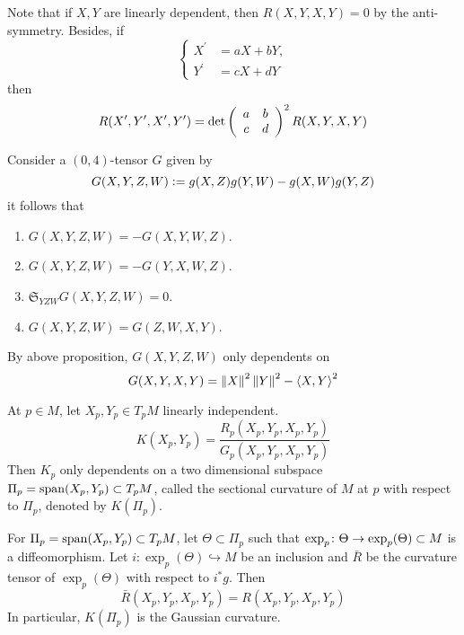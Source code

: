 \begin{enumerate}[label=\arabic{*}.]
\begin{rmk}
		Note that if $X,Y$ are linearly dependent, then $R(X,Y,X,Y) = 0$ by the anti-symmetry. Besides, if
		\begin{equation*}
			\left\{
				\begin{aligned}
					X^\prime & = aX+bY,\\
					Y^\prime & = cX+dY
				\end{aligned}
			\right.
		\end{equation*}
		then
		\begin{equation*}
			R(X^\prime,Y^\prime,X^\prime,Y^\prime) = \det\left(
				\begin{array}{cc}
					a&b\\
					c&d
				\end{array}
			\right)^2R(X,Y,X,Y)
		\end{equation*}
	\end{rmk}
	Consider a $(0,4)$-tensor $G$ given by
	\begin{equation*}
		G(X,Y,Z,W) \vcentcolon= g(X,Z)g(Y,W) - g(X,W)g(Y,Z)
	\end{equation*}
	it follows that
	\begin{enumerate}[label=(\arabic{*})]
		\item $G(X,Y,Z,W) = -G(X,Y,W,Z)$.
		\item $G(X,Y,Z,W) = -G(Y,X,W,Z)$.
		\item $\mathfrak{S}_{YZW}G(X,Y,Z,W) = 0$.
		\item $G(X,Y,Z,W) = G(Z,W,X,Y)$.
	\end{enumerate}
	By above proposition, $G(X,Y,Z,W)$ only dependents on
	\begin{equation*}
		G(X,Y,X,Y) = \left\lVert X\right\lVert^2\left\lVert Y\right\lVert^2 - \left\langle X,Y \right\rangle^2
	\end{equation*}
	\begin{defn}
		At $p \in M$, let $X_p,Y_p \in T_pM$ linearly independent.
		\begin{equation*}
			K(X_p,Y_p) = \frac{R_p(X_p,Y_p,X_p,Y_p)}{G_p(X_p,Y_p,X_p,Y_p)}
		\end{equation*}
		Then $K_p$ only dependents on a two dimensional subspace $\Pi_p = \operatorname{span}(X_p,Y_p) \subset T_pM$, called the sectional curvature of $M$ at $p$ with respect to $\Pi_p$, denoted by $K(\Pi_p)$.
	\end{defn}
	\begin{prop}
		For $\Pi_p = \operatorname{span}(X_p,Y_p) \subset T_pM$, let $\Theta \subset \Pi_p$ such that $\exp_p \colon \Theta \rightarrow \exp_p(\Theta) \subset M$ is a diffeomorphism. Let $i \colon \exp_p(\Theta) \hookrightarrow M$ be an inclusion and $\bar{R}$ be the curvature tensor of $\exp_p(\Theta)$ with respect to $i^*g$. Then
		\begin{equation*}
			\bar{R}(X_p,Y_p,X_p,Y_p) = R(X_p,Y_p,X_p,Y_p)
		\end{equation*}
		In particular, $K(\Pi_p)$ is the Gaussian curvature.
	\end{prop}


\end{enumerate}
